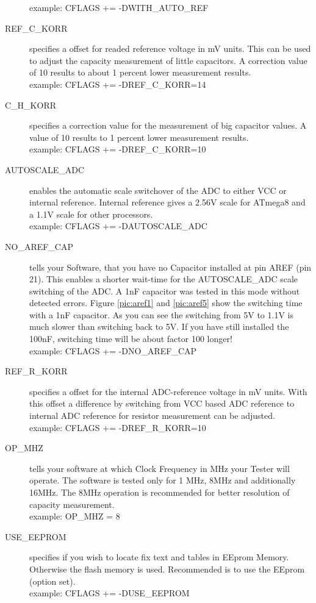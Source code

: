 \begin{description}
example:  CFLAGS += -DWITH\_AUTO\_REF
  \item[REF\_C\_KORR] specifies a offset for readed reference voltage in mV units.
This can be used to adjust the capacity measurement of little capacitors.
A correction value of 10 results to about 1 percent lower measurement results.\\
example:  CFLAGS += -DREF\_C\_KORR=14
  \item[C\_H\_KORR] specifies a correction value for the measurement of big capacitor values.
A value of 10 results to 1 percent lower measurement results.\\
example:  CFLAGS += -DREF\_C\_KORR=10
  \item[AUTOSCALE\_ADC] enables the automatic scale switchover of the ADC to either VCC or internal reference.
Internal reference gives a 2.56V scale for ATmega8 and a 1.1V scale for other processors.\\
example: CFLAGS += -DAUTOSCALE\_ADC
  \item[NO\_AREF\_CAP] tells your Software, that you have no Capacitor installed at pin AREF (pin 21).
This enables a shorter wait-time for the AUTOSCALE\_ADC scale switching of the ADC.
A 1nF capacitor was tested in this mode without detected errors.
Figure \ref{pic:aref1} and \ref{pic:aref5} show the switching time with a 1nF capacitor.
As you can see the switching from 5V to 1.1V is much slower than switching back to 5V. If you
have still installed the 100nF, switching time will be about factor 100 longer!\\
example: CFLAGS += -DNO\_AREF\_CAP
  \item[REF\_R\_KORR] specifies a offset for the internal ADC-reference voltage in mV units.
With this offset a difference by switching from VCC based ADC reference to internal ADC reference for resistor measurement can be adjusted.\\
example: CFLAGS += -DREF\_R\_KORR=10
  \item[OP\_MHZ] tells your software at which Clock Frequency in MHz your Tester will operate.
The software is tested only for 1 MHz, 8MHz and additionally 16MHz. The 8MHz operation is recommended for better resolution of capacity measurement.\\
example: OP\_MHZ = 8
  \item[USE\_EEPROM] specifies if you wish to locate fix text and tables in EEprom Memory. Otherwise the flash memory is used.
Recommended is to use the EEprom (option set).\\
example: CFLAGS += -DUSE\_EEPROM

\end{description}
